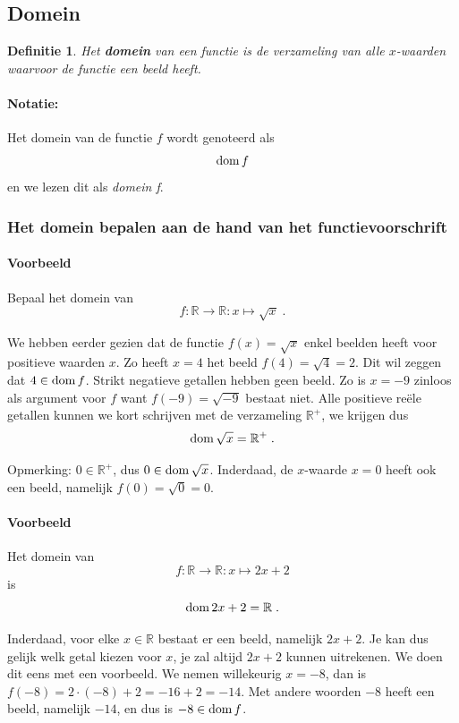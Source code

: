 \documentclass[12pt,twoside]{article}
\newtheorem{definition}{Definitie}
\begin{document}
\begin{theorie}
\subsection{Domein}

\begin{definition}
  Het {\bf domein} van een functie is de verzameling van alle $x$-waarden waarvoor de functie een beeld heeft.
\end{definition}

\paragraph{Notatie:} Het domein van de functie $f$ wordt genoteerd als $$\dom f$$ en we lezen dit als {\em domein f}.

\subsubsection*{Het domein bepalen aan de hand van het functievoorschrift}

\paragraph{Voorbeeld} Bepaal het domein van $$f:\mathbb{R}\to\mathbb{R}:x\mapsto \sqrt{x}\;.$$

We hebben eerder gezien dat de functie $f(x)=\sqrt{x}$ enkel beelden heeft voor positieve waarden $x$. Zo heeft $x=4$ het beeld $f(4)=\sqrt{4}=2$. Dit wil zeggen dat $4\in\dom f$. Strikt negatieve getallen hebben geen beeld. Zo is $x=-9$ zinloos als argument voor $f$ want $f(-9)=\sqrt{-9}$ bestaat niet. Alle positieve reële getallen kunnen we kort schrijven met de verzameling $\mathbb{R}^+$, we krijgen dus
$$\dom \sqrt{x}= \mathbb{R}^+\;.$$

Opmerking: $0\in\mathbb{R}^+$, dus $0\in\dom\sqrt{x}$. Inderdaad, de $x$-waarde $x=0$ heeft ook een beeld, namelijk $f(0)=\sqrt{0}=0$.

\paragraph{Voorbeeld}
Het domein van
$$f:\mathbb{R}\to\mathbb{R}:x\mapsto 2x+2$$
is
$$\dom 2x+2 = \mathbb{R}\;.$$

Inderdaad, voor elke $x\in\mathbb{R}$ bestaat er een beeld, namelijk $2x+2$. Je kan dus gelijk welk getal kiezen voor $x$, je zal altijd $2x+2$ kunnen uitrekenen. We doen dit eens met een voorbeeld. We nemen willekeurig $x=-8$, dan is $f(-8)=2\cdot(-8)+2=-16+2=-14$. Met andere woorden $-8$ heeft een beeld, namelijk $-14$, en dus is $-8\in\dom f$.


\end{theorie}
\end{document}
